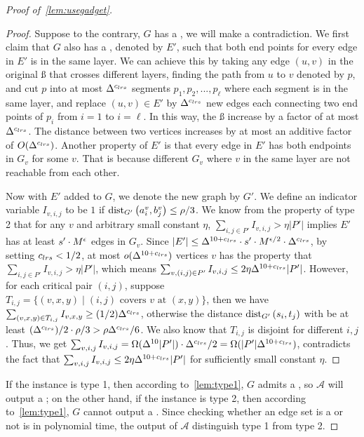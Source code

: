\begin{proof}[Proof of~\cref{lem:usegadget}]
\begin{proof}
	Suppose to the contrary, $G$ has a , we will make a contradiction. We first claim that $G$ also has a , denoted by $E'$, such that both end points for every edge in $E'$ is in the same layer. We can achieve this by taking any edge $(u,v)$ in the original \ss{} that crosses different layers, finding the path from $u$ to $v$ denoted by $p$, and cut $p$ into at most $\Delta^{c_{lrs}}$ segments $p_1,p_2,...,p_\ell$ where each segment is in the same layer, and replace $(u,v)\in E'$ by $\Delta^{{c_{lrs}}}$ new edges each connecting two end points of $p_i$ from $i=1$ to $i=\ell$. In this way, the \ss{} increase by a factor of at most $\Delta^{c_{lrs}}$. The distance between two vertices increases by at most an additive factor of $O(\Delta^{c_{lrs}})$. Another property of $E'$ is that every edge in $E'$ has both endpoints in $G_v$ for some $v$. That is because different $G_v$ where $v$ in the same layer are not reachable from each other. 
	
	Now with $E'$ added to $G$, we denote the new graph by $G'$. We define an indicator variable $I_{v,i,j}$ to be $1$ if $\text{dist}_{G'}\left(a^v_i,b^v_j\right)\le \rho{}/3$. We know from the property of type 2 that for any $v$ and arbitrary small constant $\eta$, $\sum_{i,j\in P'}I_{v,i,j}>\eta|P'|$ implies $E'$ has at least ${s'}\cdot M^{\epsilon}$ edges in $G_v$. Since $|E'|\le \Delta^{10+{c_{lrs}}}\cdot {s'}\cdot M^{\epsilon/2}\cdot \Delta^{{c_{lrs}}}$, by setting ${c_{lrs}}<1/2$, at most $o(\Delta^{10+{c_{lrs}}})$ vertices $v$ has the property that $\sum_{i,j\in P'}I_{v,i,j}>\eta|P'|$, which means $\sum_{v,(i,j)\in P'}I_{v,i,j}\le 2\eta\Delta^{10+{c_{lrs}}}|P'|$. However, for each critical pair $(i,j)$, suppose $T_{i,j}=\{(v,x,y)\mid (i,j)\text{ covers }v\text{ at }(x,y)\}$, then we have $\sum_{(v,x,y)\in T_{i,j}}I_{v,x,y}\ge (1/2)\Delta^{c_{lrs}}$, otherwise the distance $\text{dist}_{G'}\left(s_i,t_j\right)$ with be at least $(\Delta^{c_{lrs}})/2\cdot \rho{}/3>\rho{}\Delta^{c_{lrs}}/6$. We also know that $T_{i,j}$ is disjoint for different $i,j$. Thus, we get $\sum_{v,i,j}I_{v,i,j}=\Omega(\Delta^{10}|P'|)\cdot \Delta^{c_{lrs}}/2=\Omega(|P'|\Delta^{10+{c_{lrs}}})$, contradicts the fact that $\sum_{v,i,j}I_{v,i,j}\le 2\eta\Delta^{10+{c_{lrs}}}|P'|$ for sufficiently small constant $\eta$. 
	
\end{proof}

If the \gadget{\cs{}}{\epsilon} instance is type 1, then according to~\cref{lem:type1}, $G$ admits a , so $\mathcal{A}$ will output a ; on the other hand, if the \gadget{\cs{}}{\epsilon} instance is type 2, then according to~\cref{lem:type1}, $G$ cannot output a . Since checking whether an edge set is a  or not is in polynomial time, the output of $\mathcal{A}$ distinguish type 1 from type 2.

\end{proof}

